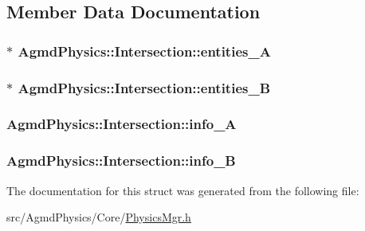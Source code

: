 \subsection{Member Data Documentation}
\hypertarget{struct_agmd_physics_1_1_intersection_a9cafc5c5df19e5fd0298cd729c572979}{
\subsubsection[{entities\+\_\+\+A}]{$\ast$ Agmd\+Physics\+::\+Intersection\+::entities\+\_\+\+A}}\label{struct_agmd_physics_1_1_intersection_a9cafc5c5df19e5fd0298cd729c572979}
\hypertarget{struct_agmd_physics_1_1_intersection_a33fed9da6f6bc16c429b64633e653fb4}{
\subsubsection[{entities\+\_\+\+B}]{$\ast$ Agmd\+Physics\+::\+Intersection\+::entities\+\_\+\+B}}\label{struct_agmd_physics_1_1_intersection_a33fed9da6f6bc16c429b64633e653fb4}
\hypertarget{struct_agmd_physics_1_1_intersection_a4526df92d5b254303c370cae1d0d2231}{
\subsubsection[{info\+\_\+\+A}]{ Agmd\+Physics\+::\+Intersection\+::info\+\_\+\+A}}\label{struct_agmd_physics_1_1_intersection_a4526df92d5b254303c370cae1d0d2231}
\hypertarget{struct_agmd_physics_1_1_intersection_a24aca6ffedcb44b723b5ae33ec16cd44}{
\subsubsection[{info\+\_\+\+B}]{ Agmd\+Physics\+::\+Intersection\+::info\+\_\+\+B}}\label{struct_agmd_physics_1_1_intersection_a24aca6ffedcb44b723b5ae33ec16cd44}


The documentation for this struct was generated from the following file\+:\begin{DoxyCompactItemize}
\item 
src/\+Agmd\+Physics/\+Core/\hyperlink{_agmd_physics_2_core_2_physics_mgr_8h}{Physics\+Mgr.\+h}\end{DoxyCompactItemize}
